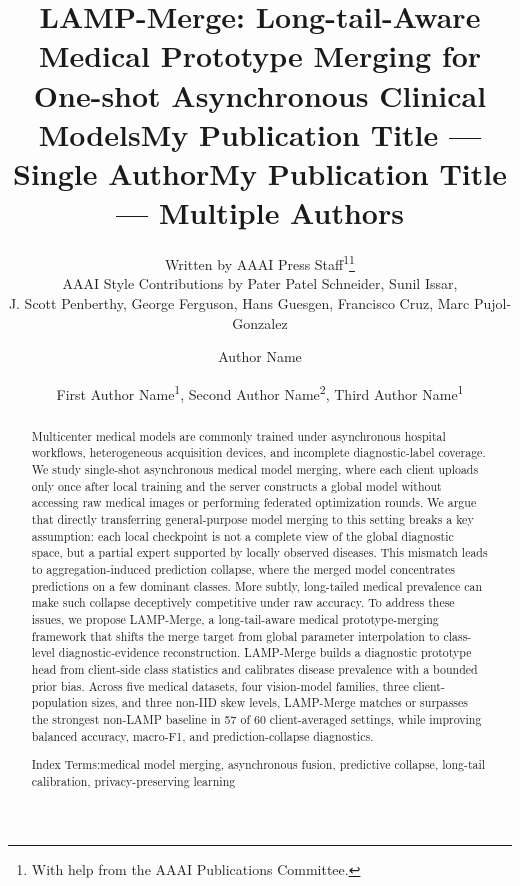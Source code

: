 \documentclass[letterpaper]{article} %
\title{LAMP-Merge: Long-tail-Aware Medical Prototype Merging for One-shot Asynchronous Clinical Models}
\author{
    Written by AAAI Press Staff\textsuperscript{\rm 1}\thanks{With help from the AAAI Publications Committee.}\\
    AAAI Style Contributions by Pater Patel Schneider,
    Sunil Issar,\\
    J. Scott Penberthy,
    George Ferguson,
    Hans Guesgen,
    Francisco Cruz\equalcontrib,
    Marc Pujol-Gonzalez\equalcontrib
}
\title{My Publication Title --- Single Author}
\author {
    Author Name
}
\title{My Publication Title --- Multiple Authors}
\author {
    First Author Name\textsuperscript{\rm 1},
    Second Author Name\textsuperscript{\rm 2},
    Third Author Name\textsuperscript{\rm 1}
}
\begin{document}
\maketitle

\begin{abstract}
%
Multicenter medical models are commonly trained under asynchronous hospital workflows, heterogeneous acquisition devices, and incomplete diagnostic-label coverage. We study single-shot asynchronous medical model merging, where each client uploads only once after local training and the server constructs a global model without accessing raw medical images or performing federated optimization rounds. We argue that directly transferring general-purpose model merging to this setting breaks a key assumption: each local checkpoint is not a complete view of the global diagnostic space, but a partial expert supported by locally observed diseases. This mismatch leads to aggregation-induced prediction collapse, where the merged model concentrates predictions on a few dominant classes. More subtly, long-tailed medical prevalence can make such collapse deceptively competitive under raw accuracy. To address these issues, we propose LAMP-Merge, a long-tail-aware medical prototype-merging framework that shifts the merge target from global parameter interpolation to class-level diagnostic-evidence reconstruction. LAMP-Merge builds a diagnostic prototype head from client-side class statistics and calibrates disease prevalence with a bounded prior bias. Across five medical datasets, four vision-model families, three client-population sizes, and three non-IID skew levels, LAMP-Merge matches or surpasses the strongest non-LAMP baseline in 57 of 60 client-averaged settings, while improving balanced accuracy, macro-F1, and prediction-collapse diagnostics.

Index Terms:medical model merging, asynchronous fusion, predictive collapse, long-tail calibration, privacy-preserving learning
\end{abstract}
\end{document}
